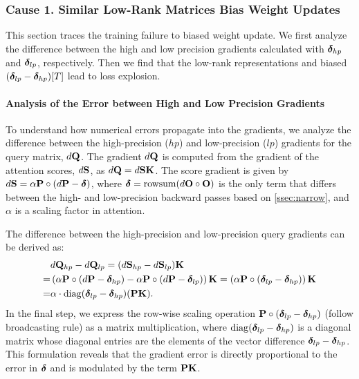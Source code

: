 \documentclass{article} %
\begin{document}
\subsubsection{Cause 1. Similar Low-Rank Matrices Bias Weight Updates}\label{ssec:cause1}

This section traces the training failure to biased weight update. We first analyze the difference between the high and low precision gradients calculated with ${\boldsymbol{\delta}}_{hp}$ and ${\boldsymbol{\delta}}_{lp}$, respectively. Then we find that the low-rank representations and biased $({\boldsymbol{\delta}}_{lp} - {\boldsymbol{\delta}}_{hp})[T]$ lead to loss explosion.

\paragraph{Analysis of the Error between High and Low Precision Gradients} To understand how numerical errors propagate into the gradients, we analyze the difference between the high-precision ($hp$) and low-precision ($lp$) gradients for the query matrix, $d{\mathbf{Q}}$. The gradient $d{\mathbf{Q}}$ is computed from the gradient of the attention scores, $d{\mathbf{S}}$, as $d{\mathbf{Q}} = d{\mathbf{S}} {\mathbf{K}}$. The score gradient is given by $d{\mathbf{S}} = \alpha {\mathbf{P}} \circ (d{\mathbf{P}} - {\boldsymbol{\delta}})$, where ${\boldsymbol{\delta}} = \mathrm{rowsum}(d{\mathbf{O}} \circ {\mathbf{O}})$ is the only term that differs between the high- and low-precision backward passes based on \cref{ssec:narrow}, and $\alpha$ is a scaling factor in attention.

The difference between the high-precision and low-precision query gradients can be derived as:
\begin{equation}\label{eq:q_diff}
  \begin{split}
  & d{\mathbf{Q}}_{hp} - d{\mathbf{Q}}_{lp} = (d{\mathbf{S}}_{hp} - d{\mathbf{S}}_{lp}){\mathbf{K}} \\
  =& \left( \alpha {\mathbf{P}} \circ (d{\mathbf{P}} - {\boldsymbol{\delta}}_{hp}) - \alpha {\mathbf{P}} \circ (d{\mathbf{P}} - {\boldsymbol{\delta}}_{lp}) \right) {\mathbf{K}}
  = \left( \alpha {\mathbf{P}} \circ ({\boldsymbol{\delta}}_{lp} - {\boldsymbol{\delta}}_{hp}) \right) {\mathbf{K}} \\
  =& \alpha \cdot \mathrm{diag}({\boldsymbol{\delta}}_{lp} - {\boldsymbol{\delta}}_{hp}) ({\mathbf{P}} {\mathbf{K}}).
  \end{split}
\end{equation}
In the final step, we express the row-wise scaling operation ${\mathbf{P}} \circ ({\boldsymbol{\delta}}_{lp} - {\boldsymbol{\delta}}_{hp})$ (follow broadcasting rule) as a matrix multiplication, where $\mathrm{diag}({\boldsymbol{\delta}}_{lp} - {\boldsymbol{\delta}}_{hp})$  is a diagonal matrix whose diagonal entries are the elements of the vector difference ${\boldsymbol{\delta}}_{lp} - {\boldsymbol{\delta}}_{hp}$. This formulation reveals that the gradient error is directly proportional to the error in ${\boldsymbol{\delta}}$ and is modulated by the term ${\mathbf{P}} {\mathbf{K}}$.
\end{document}
